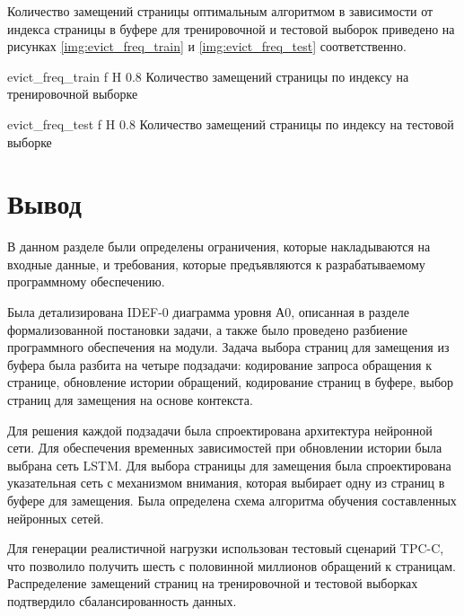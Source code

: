 Количество замещений страницы оптимальным алгоритмом в зависимости от индекса страницы в буфере для тренировочной и тестовой выборок приведено на рисунках \ref{img:evict_freq_train} и \ref{img:evict_freq_test} соответственно.

{evict_freq_train} %
{f} %
{H} %
{0.8\textwidth} %
{Количество замещений страницы по индексу на тренировочной выборке} %

{evict_freq_test} %
{f} %
{H} %
{0.8\textwidth} %
{Количество замещений страницы по индексу на тестовой выборке} %


\section{Вывод}

В данном разделе были определены ограничения, которые накладываются на входные данные, и требования, которые предъявляются к разрабатываемому программному обеспечению.

Была детализирована IDEF-0 диаграмма уровня А0, описанная в разделе формализованной постановки задачи, а также было проведено разбиение программного обеспечения на модули.
Задача выбора страниц для замещения из буфера была разбита на четыре подзадачи: кодирование запроса обращения к странице, обновление истории обращений, кодирование страниц в буфере, выбор страниц для замещения на основе контекста.

Для решения каждой подзадачи была спроектирована архитектура нейронной сети.
Для обеспечения временных зависимостей при обновлении истории была выбрана сеть LSTM.
Для выбора страницы для замещения была спроектирована указательная сеть с механизмом внимания, которая выбирает одну из страниц в буфере для замещения.
Была определена схема алгоритма обучения составленных нейронных сетей.

Для генерации реалистичной нагрузки использован тестовый сценарий TPC-C, что позволило получить шесть с половинной миллионов обращений к страницам.
Распределение замещений страниц на тренировочной и тестовой выборках подтвердило сбалансированность данных.